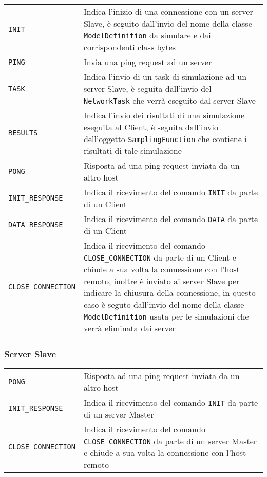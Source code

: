 \begin{table}[H]
    \begin{tabularx}{\linewidth}{ l X }
        \texttt{INIT} & Indica l'inizio di una connessione con un server Slave, è seguito dall'invio del nome della classe \texttt{ModelDefinition} da simulare e dai corrispondenti class bytes \\
        \texttt{PING} & Invia una ping request ad un server \\
        \texttt{TASK} & Indica l'invio di un task di simulazione ad un server Slave, è seguita dall'invio del \texttt{NetworkTask} che verrà eseguito dal server Slave \\
        \texttt{RESULTS} & Indica l'invio dei risultati di una simulazione eseguita al Client, è seguita dall'invio dell'oggetto \texttt{SamplingFunction} che contiene i risultati di tale simulazione \\
        \texttt{PONG} & Risposta ad una ping request inviata da un altro host \\
        \texttt{INIT\_RESPONSE} & Indica il ricevimento del comando \texttt{INIT} da parte di un Client \\
        \texttt{DATA\_RESPONSE} & Indica il ricevimento del comando \texttt{DATA} da parte di un Client\\
        \texttt{CLOSE\_CONNECTION} & Indica il ricevimento del comando \texttt{CLOSE\_CONNECTION} da parte di un Client e chiude a sua volta la connessione con l'host remoto, inoltre è inviato ai server Slave per indicare la chiusura della connessione, in questo caso è seguto dall'invio del nome della classe \texttt{ModelDefinition} usata per le simulazioni che verrà eliminata dai server
    \end{tabularx}
\end{table}

\subsubsection{Server Slave}

\begin{table}[H]
    \begin{tabularx}{\linewidth}{ l X }
        \texttt{PONG} & Risposta ad una ping request inviata da un altro host \\
        \texttt{INIT\_RESPONSE} & Indica il ricevimento del comando \texttt{INIT} da parte di un server Master \\
        \texttt{CLOSE\_CONNECTION} & Indica il ricevimento del comando \texttt{CLOSE\_CONNECTION} da parte di un server Master e chiude a sua volta la connessione con l'host remoto \\
    \end{tabularx}
\end{table}

